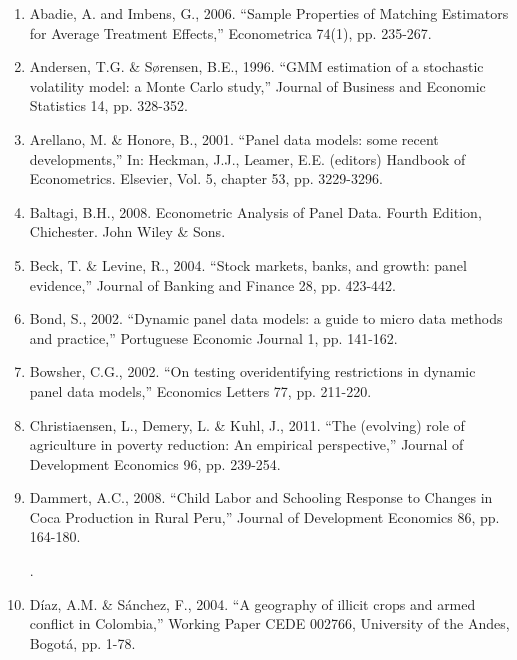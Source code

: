 \begin{enumerate} \footnotesize
\item Abadie, A. and Imbens, G., 2006. ``Sample Properties of Matching Estimators for Average Treatment Effects,'' Econometrica 74(1), pp. 235-267.


\item Andersen, T.G. \& S\o rensen, B.E., 1996. ``GMM estimation of a stochastic volatility model: a Monte Carlo study,'' Journal of Business and Economic Statistics 14, pp. 328-352.



\item Arellano, M. \& Honore, B., 2001. ``Panel data models: some recent developments,'' In: Heckman, J.J., Leamer, E.E. (editors) Handbook of Econometrics. Elsevier, Vol. 5, chapter 53, pp. 3229-3296.

\item Baltagi, B.H., 2008. Econometric Analysis of Panel Data. Fourth Edition, Chichester. John Wiley \& Sons.

\item Beck, T. \& Levine, R., 2004. ``Stock markets, banks, and growth: panel evidence,'' Journal of Banking
and Finance 28, pp. 423-442.



\item Bond, S., 2002. ``Dynamic panel data models:
a guide to micro data methods and practice,'' Portuguese Economic Journal 1, pp. 141-162.

\item Bowsher, C.G., 2002. ``On testing overidentifying restrictions in dynamic panel data models,'' Economics Letters 77, pp. 211-220.


\item Christiaensen, L., Demery, L. \& Kuhl, J., 2011. ``The (evolving) role of agriculture in poverty reduction: An empirical perspective,'' Journal of Development Economics 96, pp. 239-254.


\item Dammert, A.C., 2008. ``Child Labor and Schooling Response to Changes in Coca Production in Rural Peru,'' Journal of Development Economics 86, pp. 164-180.

.

\item D\'{i}az, A.M. \& S\'{a}nchez, F., 2004. ``A geography of illicit crops and armed conflict in Colombia,'' Working Paper CEDE 002766, University of the Andes, Bogot\'{a}, pp. 1-78.


\end{enumerate}
